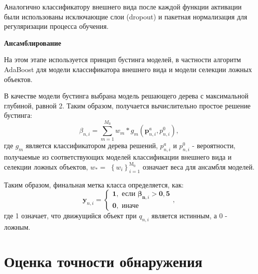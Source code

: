 Аналогично классификатору внешнего вида после каждой функции активации были использованы исключающие слои (dropout) и пакетная нормализация для регуляризации процесса обучения.

\textbf{Ансамблирование}

На этом этапе используется принцип бустинга моделей, в частности алгоритм AdaBoost \cite{Freund1999ASI} для модели классификатора внешнего вида и модели селекции ложных объектов.

В качестве модели бустинга выбрана модель решающего дерева с максимальной глубиной, равной 2. Таким образом, получается вычислительно простое решение бустинга:
\begin{equation}
\beta_{n, i}=\sum_{m=1}^{M_0} w_m * g_m\left(\boldsymbol{p}_{n, i}^a, p_{n, i}^0\right),
\end{equation}
где $g_m$ является классификатором дерева решений, $p_{n, i}^a$ и $p_{n, i}^0$ - вероятности, получаемые из соответствующих моделей классификации внешнего вида и селекции ложных объектов, $w_*=$ $\left\{w_i\right\}_{i=1}^{\mathrm{M}_0}$ означает веса для ансамбля моделей.

Таким образом, финальная метка класса определяется, как:
\begin{equation}
\boldsymbol{y}_{n, i}=\left\{\begin{array}{l}
\mathbf{1}, \text { если } \boldsymbol{\beta}_{\boldsymbol{n}, i}>\mathbf{0 , 5} \\
\mathbf{0 ,} \text { иначе }
\end{array},\right.
\end{equation}
где 1 означает, что движущийся объект при $q_{n, i}$ является истинным, а 0 - ложным.

\section{Оценка точности обнаружения}



